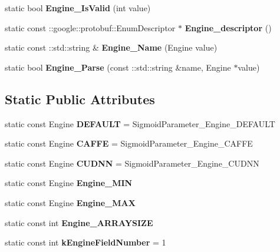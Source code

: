 \begin{DoxyCompactItemize}
\item 
\mbox{\label{classcaffe_1_1_sigmoid_parameter_abd046e1bced8772a81d2e888b936103e}} 
static bool {\bfseries Engine\+\_\+\+Is\+Valid} (int value)
\item 
\mbox{\label{classcaffe_1_1_sigmoid_parameter_a25f7229e9ba77f0c908a7fdf78d8a759}} 
static const \+::google\+::protobuf\+::\+Enum\+Descriptor $\ast$ {\bfseries Engine\+\_\+descriptor} ()
\item 
\mbox{\label{classcaffe_1_1_sigmoid_parameter_a3ee655453aae693899b4fbd628726ac5}} 
static const \+::std\+::string \& {\bfseries Engine\+\_\+\+Name} (Engine value)
\item 
\mbox{\label{classcaffe_1_1_sigmoid_parameter_a2acb0cd957d731158b8d667deadc2fb5}} 
static bool {\bfseries Engine\+\_\+\+Parse} (const \+::std\+::string \&name, Engine $\ast$value)
\end{DoxyCompactItemize}
\subsection*{Static Public Attributes}
\begin{DoxyCompactItemize}
\item 
\mbox{\label{classcaffe_1_1_sigmoid_parameter_a96c37e9abcb7b3209a658b7c7c0c8425}} 
static const Engine {\bfseries D\+E\+F\+A\+U\+LT} = Sigmoid\+Parameter\+\_\+\+Engine\+\_\+\+D\+E\+F\+A\+U\+LT
\item 
\mbox{\label{classcaffe_1_1_sigmoid_parameter_a65331a2164556bc2790895948ab893f9}} 
static const Engine {\bfseries C\+A\+F\+FE} = Sigmoid\+Parameter\+\_\+\+Engine\+\_\+\+C\+A\+F\+FE
\item 
\mbox{\label{classcaffe_1_1_sigmoid_parameter_aeba841e13dc4c28c4fc9789a83229dbd}} 
static const Engine {\bfseries C\+U\+D\+NN} = Sigmoid\+Parameter\+\_\+\+Engine\+\_\+\+C\+U\+D\+NN
\item 
static const Engine {\bfseries Engine\+\_\+\+M\+IN}
\item 
static const Engine {\bfseries Engine\+\_\+\+M\+AX}
\item 
static const int {\bfseries Engine\+\_\+\+A\+R\+R\+A\+Y\+S\+I\+ZE}
\item 
\mbox{\label{classcaffe_1_1_sigmoid_parameter_ae46d59e2a29f0c44e50815bc48929626}} 
static const int {\bfseries k\+Engine\+Field\+Number} = 1
\end{DoxyCompactItemize}
